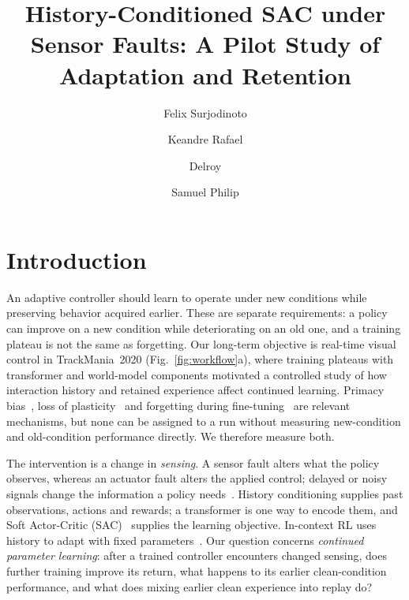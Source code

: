 \documentclass[runningheads]{llncs}
\begin{document}
\title{History-Conditioned SAC under Sensor Faults: A Pilot Study of Adaptation and Retention}
\author{Felix Surjodinoto \and Keandre Rafael \and Delroy \and Samuel Philip}
\maketitle

\begin{abstract}

\end{abstract}

\section{Introduction}
An adaptive controller should learn to operate under new conditions while preserving behavior acquired earlier. These are separate requirements: a policy can improve on a new condition while deteriorating on an old one, and a training plateau is not the same as forgetting. Our long-term objective is real-time visual control in TrackMania~2020 (Fig.~\ref{fig:workflow}a), where training plateaus with transformer and world-model components motivated a controlled study of how interaction history and retained experience affect continued learning. Primacy bias~\cite{primacy}, loss of plasticity~\cite{plasticity} and forgetting during fine-tuning~\cite{finetuneforget} are relevant mechanisms, but none can be assigned to a run without measuring new-condition and old-condition performance directly. We therefore measure both.

The intervention is a change in \emph{sensing}. A sensor fault alters what the policy observes, whereas an actuator fault alters the applied control; delayed or noisy signals change the information a policy needs~\cite{signaldelay}. History conditioning supplies past observations, actions and rewards; a transformer is one way to encode them, and Soft Actor-Critic (SAC)~\cite{sac} supplies the learning objective. In-context RL uses history to adapt with fixed parameters~\cite{rl2,amago,ad}. Our question concerns \emph{continued parameter learning}: after a trained controller encounters changed sensing, does further training improve its return, what happens to its earlier clean-condition performance, and what does mixing earlier clean experience into replay do?
\end{document}
